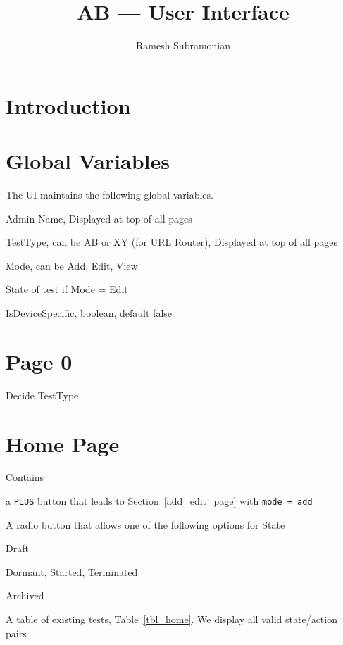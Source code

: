 \documentclass[letterpaper]{article}
\begin{document}
\title{AB --- User Interface}
\author{ Ramesh Subramonian }
\maketitle
\thispagestyle{fancy}
\lhead{}
\chead{}
\rhead{}
\cfoot{}
\rfoot{{\small \thepage}}

\section{Introduction}

\section{Global Variables}
The UI maintains the following global variables. 
\be
\item Admin Name, Displayed at top of all pages
\item TestType, can be AB or XY (for URL Router), 
  Displayed at top of all pages
\item Mode, can be Add, Edit, View
\item State of test if Mode = Edit
\item IsDeviceSpecific, boolean, default false
\ee

\section{Page 0}

Decide TestType

\section{Home Page}
\label{home_page}
Contains 
\be
\item a {\tt PLUS} button that leads to Section~\ref{add_edit_page} with {\tt mode =
  add}
\item A radio button that allows one of the following options for State
  \be
\item Draft
\item Dormant, Started, Terminated
\item Archived
  \ee
\item A table of existing tests, Table~\ref{tbl_home}. We display all valid
  state/action pairs
\ee
\end{document}
